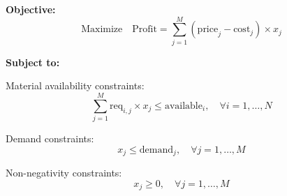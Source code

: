 \documentclass{article}
\begin{document}
\textbf{Objective:}
\[
\text{Maximize} \quad \text{Profit} = \sum_{j=1}^{M} ( \text{price}_j - \text{cost}_j ) \times x_j
\]

\textbf{Subject to:}

Material availability constraints:
\[
\sum_{j=1}^{M} \text{req}_{i,j} \times x_j \leq \text{available}_i, \quad \forall i = 1, \ldots, N
\]

Demand constraints:
\[
x_j \leq \text{demand}_j, \quad \forall j = 1, \ldots, M
\]

Non-negativity constraints:
\[
x_j \geq 0, \quad \forall j = 1, \ldots, M
\]
\end{document}
